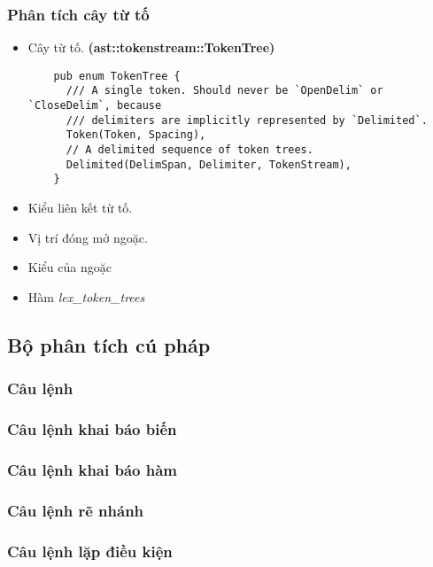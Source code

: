 {\subsubsection{Phân tích cây từ tố}
\begin{itemize}
  \item \label{ap1:tokentree}Cây từ tố. \textbf{(ast::tokenstream::TokenTree)}
  \begin{lstlisting}
    pub enum TokenTree {
      /// A single token. Should never be `OpenDelim` or `CloseDelim`, because
      /// delimiters are implicitly represented by `Delimited`.
      Token(Token, Spacing),
      // A delimited sequence of token trees.
      Delimited(DelimSpan, Delimiter, TokenStream),
    }
  \end{lstlisting}
  \item Kiểu liên kết từ tố.
  \item Vị trí đóng mở ngoặc.
  \item Kiểu của ngoặc
  \item Hàm \textit{lex\_token\_trees}
\end{itemize}

\subsection{Bộ phân tích cú pháp}
\subsubsection{Câu lệnh}
\label{ap1:stmt}

\subsubsection{Câu lệnh khai báo biến}
\label{ap1:stmtdeclvar}

\subsubsection{Câu lệnh khai báo hàm}
\label{ap1:stmtdeclfun}

\subsubsection{Câu lệnh rẽ nhánh}
\label{ap1:stmtwhen}

\subsubsection{Câu lệnh lặp điều kiện}
\label{ap1:stmtduring}

}
